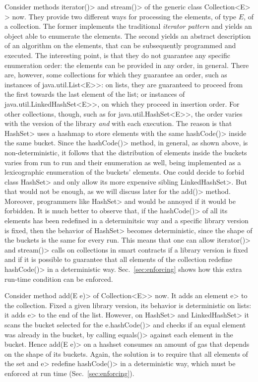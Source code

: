 Consider methods \<iterator()> and \<stream()> of the generic class
\<Collection$\text{<}$E$\text{>}$> now. They provide two different ways for
processing the elements, of type $E$, of a collection. The former implements
the traditional \emph{iterator pattern} and yields an object able to enumerate
the elements. The second yields an abstract description of an algorithm on the
elements, that can be subsequently programmed and executed. The interesting point, is
that they do not guarantee any specific enumeration order: the elements can be
provided in any order, in general. There are, however, some collections for which they
guarantee an order, such as instances of \<java.util.List$\text{<}$E$\text{>}$>:
on lists, they are guaranteed to proceed from the first towards the last element of the list;
or instances of \<java.util.LinkedHashSet$\text{<}$E$\text{>}$>, on which they proceed in
insertion order.
For other collections, though, such as for \<java.util.HashSet$\text{<}$E$\text{>}$>, the order
varies with the version of the library \emph{and} with each execution. The reason is that
\<HashSet> uses a hashmap to store elements with the same \<hashCode()> inside the same bucket.
Since the \<hashCode()> method, in general, as shown above, is non-deterministic, it follows
that the distribution of elements inside the buckets varies from run to run and their enumeration
as well, being implemented as a lexicographic enumeration of the buckets' elements.
One could decide to forbid class \<HashSet> and only allow its
more expensive sibling \<LinkedHashSet>. But that would not be enough, as we will discuss later
for the \<add()> method. Moreover, programmers like \<HashSet> and would be annoyed if it would be
forbidden. It is much better to observe that, if the \<hashCode()> of all its elements has been
redefined in a determinitsic way
and a specific library version is fixed, then the behavior of \<HashSet> becomes
deterministic, since the shape of the buckets is the same for every run. This means that one
can allow \<iterator()> and \<stream()> calls on collections
in smart contracts if a library version is fixed and if
it is possible to guarantee that all elements of the collection redefine \<hashCode()>
in a deterministic way. Sec.~\ref{sec:enforcing} shows how this extra run-time condition
can be enforced.

Consider method \<add(E e)> of \<Collection$\text{<}$E$\text{>}$> now.
It adds an element \<e> to the collection. Fixed a given library version,
its behavior is deterministic on lists: it adds \<e> to the end of the list.
However, on \<HashSet> and \<LinkedHashSet> it scans the bucket selected
for the \<e.hashCode()> and checks if an equal element was already in the
bucket, by calling \<equals()> against each element in the bucket. Hence \<add(E e)>
on a hashset consumes an amount of gas that depends on the shape of its buckets.
Again, the solution is to require that all elements of the set and \<e> redefine
\<hashCode()> in a deterministic way, which must be enforced at run time
(Sec.~\ref{sec:enforcing}).

